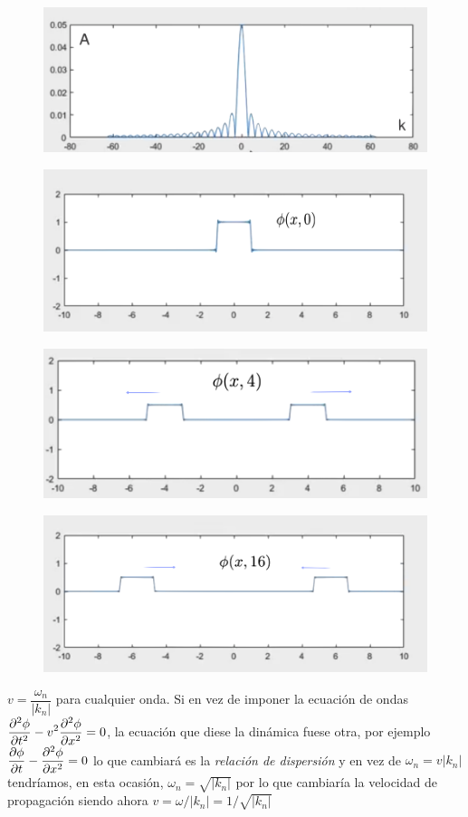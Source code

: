 \begin{example}
\vspace{5mm}
\begin{multicols}{2}
\begin{figure}[H]
	\centering
	\includegraphics[width=.5\textwidth]{imagenes/apendices-DFT1.png}
\end{figure}	
\begin{figure}[H]
	\centering
	\includegraphics[width=.45\textwidth]{imagenes/apendices-DFT2.png}
\end{figure}	
\end{multicols}

\begin{multicols}{2}
\begin{figure}[H]
	\centering
	\includegraphics[width=.5\textwidth]{imagenes/apendices-DFT3.png}
\end{figure}	
\begin{figure}[H]
	\centering
	\includegraphics[width=.45\textwidth]{imagenes/apendices-DFT4.png}
\end{figure}	
\end{multicols}



$v=\dfrac {\omega_n}{|k_n|}$ para cualquier onda. Si en vez de imponer la ecuación de ondas $\displaystyle \pdv[2]{\phi}{t}-v^2\pdv[2]{\phi}{x}=0$, la ecuación que diese la dinámica fuese otra, por ejemplo  $\displaystyle \pdv{\phi}{t}-\pdv[2]{\phi}{x}=0$ lo que cambiará es la \emph{relación de dispersión} y en vez de $\omega_n=v|k_n|$ tendríamos, en esta ocasión, $\omega_n=\sqrt{|k_n|}$ por lo que cambiaría la velocidad de propagación siendo ahora $v=\omega/|k_n|=1/\sqrt{|k_n|}$


\end{example}
